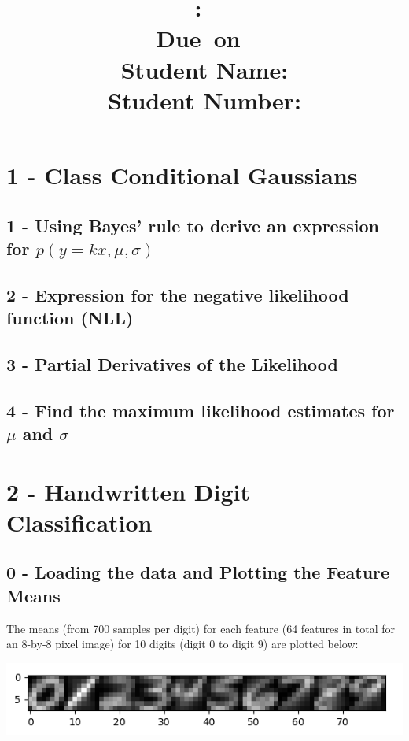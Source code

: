 \documentclass[10pt]{article}
\title{
    \vspace{2in}
    \textmd{\textbf{\hmwkClass:\ \hmwkTitle}}\\
    \vspace{0.1in}\small{Due\ on\ \hmwkDueDate}\\
    \vspace{3in}
    \vspace{0.1in}\large{Student Name: \textbf{\hmwkAuthorName} } \\
    \vspace{0.1in}\large{Student Number: \textbf{\hmwkAuthorNumber} } \\
}
\date{}
\begin{document}
\maketitle
\pagebreak

\begin{center} \tableofcontents \end{center}
\pagebreak

\clearpage
\setcounter{page}{1}

\section{1 - Class Conditional Gaussians}
\subsection{1 - Using Bayes’ rule to derive an expression for $p(y = kx, \mu,\sigma)$}
\subsection{2 - Expression for the negative likelihood function (NLL)}
\subsection{3 - Partial Derivatives of the Likelihood}
\subsection{4 - Find the maximum likelihood estimates for $\mu$ and $\sigma$}


\section{2 - Handwritten Digit Classification}
\subsection{0 - Loading the data and Plotting the Feature Means}

The means (from 700 samples per digit) for each feature (64 features in total for an 8-by-8 pixel image) for 10 digits (digit 0 to digit 9) are plotted below: 

\begin{center}
\includegraphics[scale=1]{averages.png}
\end{center}
\end{document}
